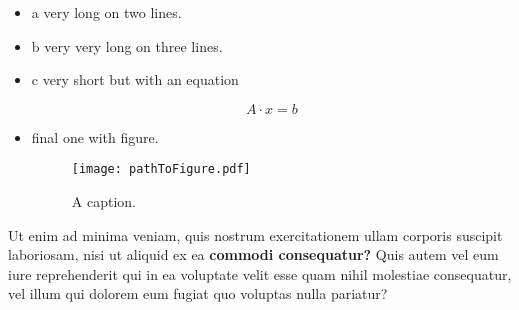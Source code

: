 \begin{itemize}
\item a very long 
on two lines.

\item b very very long 
 on three
 lines.

\item c very short but 
 with an equation 

\begin{equation}
A \cdot x = b
\label{eq:eqinItem}
\end{equation}

\item final one with figure.

\begin{figure}
\texttt{[image: pathToFigure.pdf]}
\caption{A caption.}
\end{figure}

\end{itemize}

Ut enim ad minima veniam, quis nostrum exercitationem ullam corporis suscipit laboriosam, nisi ut aliquid ex ea \textbf{commodi consequatur?} Quis autem vel eum iure reprehenderit qui in ea voluptate velit esse quam nihil molestiae consequatur, vel illum qui dolorem eum fugiat quo voluptas nulla pariatur?
